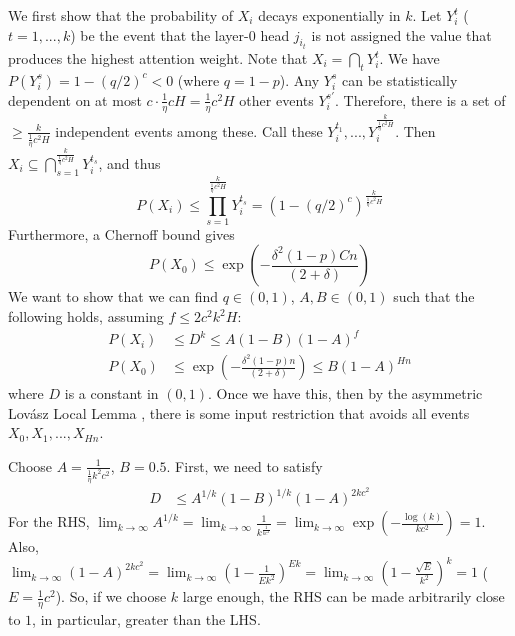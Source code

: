 \documentclass[11pt,a4paper]{article}
\begin{document}
We first show that the probability of $X_i$ decays exponentially in $k$.
Let $Y_i^t$ ($t=1,...,k$) be the event that the layer-0 head $j_{i_t}$ is not assigned the value that produces the highest attention weight.
Note that $X_i = \bigcap_t Y_i^t$.
We have $P(Y_i^s) = 1-(q/2)^c < 0$ (where $q = 1-p$).
Any $Y_i^s$ can be statistically dependent on at most $c \cdot \frac{1}{\eta}cH = \frac{1}{\eta}c^2H$ other events $Y_i^{s'}$.
Therefore, there is a set of $\geq \frac{k}{\frac{1}{\eta}c^2H}$ independent events among these.
Call these $Y_i^{t_1}, ..., Y_i^{\frac{k}{\frac{1}{\eta}c^2H}}$.
Then $X_i \subseteq \bigcap_{s=1}^{\frac{k}{\frac{1}{\eta}c^2H}} Y_i^{t_s}$, and thus
\begin{equation}
    P(X_i) \leq \prod_{s=1}^{\frac{k}{\frac{1}{\eta}c^2H}} Y_i^{t_s} = \left(1-(q/2)^c\right)^{\frac{k}{\frac{1}{\eta}c^2H}}
\end{equation}
Furthermore, a Chernoff bound gives
\begin{equation}
P(X_0) \leq    \exp\left(-\frac{\delta^2(1-p)Cn}{(2+\delta)}\right)
\end{equation}
We want to show that we can find $q \in (0,1)$, $A, B \in (0,1)$ such that the following holds, assuming $f \leq 2c^2k^2H$:
\begin{align}
 P(X_i) &\leq  D^k \leq A(1-B)(1-A)^f \\
P(X_0) &\leq \exp\left(-\frac{\delta^2(1-p)n}{(2+\delta)}\right)  \leq B (1-A)^{Hn}
\end{align}
where $D$ is a constant in $(0,1)$.
Once we have this, then by the asymmetric Lov{\'a}sz Local Lemma \cite{mitzenmacherprobability}, there is some input restriction that avoids all events $X_0, X_1, ..., X_{Hn}$.

Choose %
$A=\frac{1}{\frac{1}{\eta}k^2c^2}$, $B=0.5$.
First, we need to satisfy
\begin{align}
    D &\leq A^{1/k}(1-B)^{1/k}(1-A)^{2kc^2} 
\end{align}
For the RHS, 
$\lim_{k\rightarrow \infty} A^{1/k} = \lim_{k\rightarrow \infty} \frac{1}{k^\frac{1}{kc^2}} = \lim_{k\rightarrow \infty} \exp(-\frac{\log(k)}{kc^2}) = 1$.
Also, $\lim_{k\rightarrow \infty} (1-A)^{2kc^2} = \lim_{k\rightarrow \infty} (1-\frac{1}{Ek^2})^{Ek} = \lim_{k\rightarrow \infty} (1-\frac{\sqrt{E}}{k^2})^{k} = 1$ ($E = \frac{1}{\eta}c^2$). So, if we choose $k$ large enough, the RHS can be made arbitrarily close to $1$, in particular, greater than the LHS.
\end{document}
